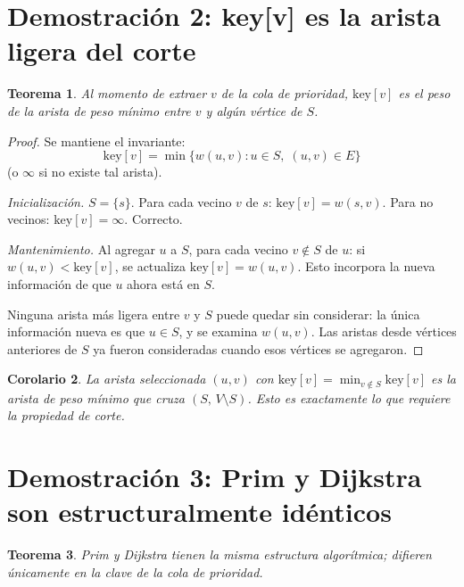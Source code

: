 \documentclass[11pt, letterpaper]{article}
\theoremstyle{definition}
\theoremstyle{plain}
\newtheorem{theorem}{Teorema}[section]
\newtheorem{corollary}[theorem]{Corolario}
\theoremstyle{remark}
\begin{document}
\section{Demostración 2: key[v] es la arista ligera del corte}

\begin{theorem}\label{thm:key}
Al momento de extraer $v$ de la cola de prioridad,
$\mathrm{key}[v]$ es el peso de la arista de peso mínimo entre $v$
y algún vértice de $S$.
\end{theorem}

\begin{proof}
Se mantiene el invariante:
\[
  \mathrm{key}[v]
  = \min\{w(u, v) : u \in S,\; (u, v) \in E\}
\]
(o $\infty$ si no existe tal arista).

\emph{Inicialización.} $S = \{s\}$. Para cada vecino $v$ de $s$:
$\mathrm{key}[v] = w(s, v)$. Para no vecinos:
$\mathrm{key}[v] = \infty$. Correcto. \checkmark

\emph{Mantenimiento.} Al agregar $u$ a $S$, para cada vecino
$v \notin S$ de $u$: si $w(u, v) < \mathrm{key}[v]$, se actualiza
$\mathrm{key}[v] = w(u, v)$. Esto incorpora la nueva información de
que $u$ ahora está en $S$.

Ninguna arista más ligera entre $v$ y $S$ puede quedar sin
considerar: la única información nueva es que $u \in S$, y se examina
$w(u, v)$. Las aristas desde vértices anteriores de $S$ ya fueron
consideradas cuando esos vértices se agregaron. \checkmark
\end{proof}

\begin{corollary}
La arista seleccionada $(u, v)$ con
$\mathrm{key}[v] = \min_{v \notin S} \mathrm{key}[v]$ es la arista
de peso mínimo que cruza $(S,\, V \setminus S)$. Esto es exactamente
lo que requiere la propiedad de corte.
\end{corollary}

\section{Demostración 3: Prim y Dijkstra son estructuralmente
  idénticos}

\begin{theorem}\label{thm:equiv}
Prim y Dijkstra tienen la misma estructura algorítmica; difieren
únicamente en la clave de la cola de prioridad.
\end{theorem}
\end{document}
